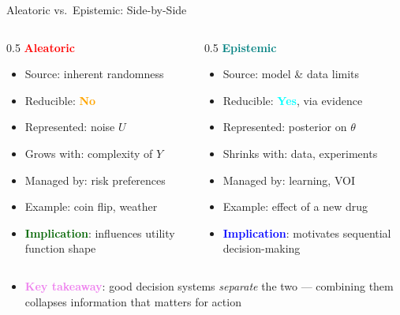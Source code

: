 \documentclass[
  10pt,
  ignorenonframetext,
]{beamer}
\providecommand{\tightlist}{%
  \setlength{\itemsep}{0pt}\setlength{\parskip}{0pt}}
\begin{document}
\begin{frame}{Aleatoric vs.~Epistemic: Side-by-Side}
\label{aleatoric-vs.-epistemic-side-by-side}
\begin{columns}[T]
\begin{column}{0.5\textwidth}
\textbf{\textcolor{red}{Aleatoric}}

\begin{itemize}
\item
  Source: inherent randomness
\item
  Reducible: \textbf{\textcolor{orange}{No}}
\item
  Represented: noise \(U\)
\item
  Grows with: complexity of \(Y\)
\item
  Managed by: risk preferences
\item
  Example: coin flip, weather
\item
  \textbf{\textcolor{darkgreen}{Implication}}: influences utility
  function shape
\end{itemize}
\end{column}

\begin{column}{0.5\textwidth}
\textbf{\textcolor{teal}{Epistemic}}

\begin{itemize}
\item
  Source: model \& data limits
\item
  Reducible: \textbf{\textcolor{cyan}{Yes}}, via evidence
\item
  Represented: posterior on \(\theta\)
\item
  Shrinks with: data, experiments
\item
  Managed by: learning, VOI
\item
  Example: effect of a new drug
\item
  \textbf{\textcolor{blue}{Implication}}: motivates sequential
  decision-making
\end{itemize}
\end{column}
\end{columns}

\begin{itemize}
\tightlist
\item
  \textbf{\textcolor{violet}{Key takeaway}}: good decision systems
  \emph{separate} the two --- combining them collapses information that
  matters for action
\end{itemize}
\end{frame}
\end{document}
